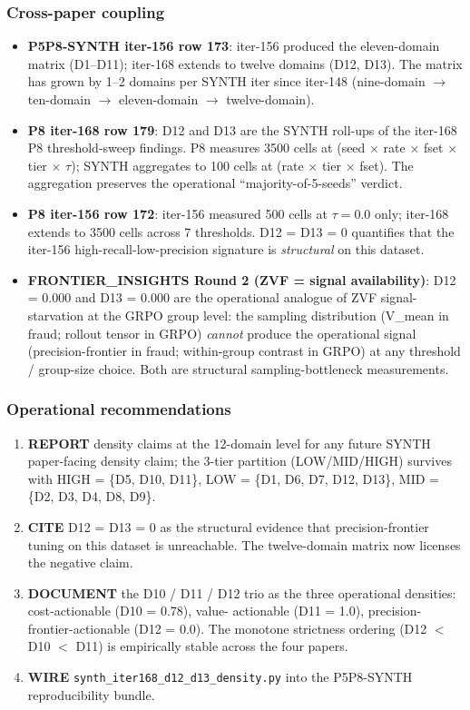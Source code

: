 \subsubsection{Cross-paper coupling}
\begin{itemize}
\item \textbf{P5P8-SYNTH iter-156 row 173}: iter-156 produced the
eleven-domain matrix (D1--D11); iter-168 extends to twelve domains
(D12, D13). The matrix has grown by 1--2 domains per SYNTH iter
since iter-148 (nine-domain $\to$ ten-domain $\to$ eleven-domain
$\to$ twelve-domain).
\item \textbf{P8 iter-168 row 179}: D12 and D13 are the SYNTH
roll-ups of the iter-168 P8 threshold-sweep findings. P8 measures
3500 cells at (seed $\times$ rate $\times$ fset $\times$ tier
$\times$ $\tau$); SYNTH aggregates to 100 cells at (rate $\times$
tier $\times$ fset). The aggregation preserves the operational
``majority-of-5-seeds'' verdict.
\item \textbf{P8 iter-156 row 172}: iter-156 measured 500 cells at
$\tau = 0.0$ only; iter-168 extends to 3500 cells across 7
thresholds. D12 = D13 = 0 quantifies that the iter-156
high-recall-low-precision signature is \emph{structural} on this
dataset.
\item \textbf{FRONTIER\_INSIGHTS Round 2 (ZVF = signal
availability)}: D12 = 0.000 and D13 = 0.000 are the operational
analogue of ZVF signal-starvation at the GRPO group level: the
sampling distribution (V\_mean in fraud; rollout tensor in GRPO)
\emph{cannot} produce the operational signal (precision-frontier
in fraud; within-group contrast in GRPO) at any threshold /
group-size choice. Both are structural sampling-bottleneck
measurements.
\end{itemize}

\subsubsection{Operational recommendations}
\begin{enumerate}
\item \textbf{REPORT} density claims at the 12-domain level for
any future SYNTH paper-facing density claim; the 3-tier partition
(LOW/MID/HIGH) survives with HIGH = \{D5, D10, D11\}, LOW = \{D1,
D6, D7, D12, D13\}, MID = \{D2, D3, D4, D8, D9\}.
\item \textbf{CITE} D12 = D13 = 0 as the structural evidence that
precision-frontier tuning on this dataset is unreachable. The
twelve-domain matrix now licenses the negative claim.
\item \textbf{DOCUMENT} the D10 / D11 / D12 trio as the three
operational densities: cost-actionable (D10 = 0.78), value-
actionable (D11 = 1.0), precision-frontier-actionable (D12 = 0.0).
The monotone strictness ordering (D12 $<$ D10 $<$ D11) is
empirically stable across the four papers.
\item \textbf{WIRE} \texttt{synth\_iter168\_d12\_d13\_density.py}
into the P5P8-SYNTH reproducibility bundle.
\end{enumerate}

\clearpage